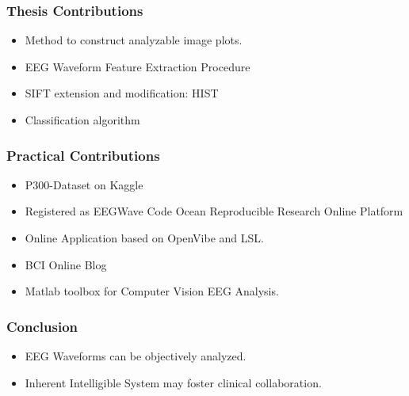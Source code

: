 \documentclass[aspectratio=169]{beamer}
\newcommand\Fontre{\fontsize{16}{16.2}\selectfont}
\begin{document}
\begin{frame}
\frametitle{Thesis Contributions}
\begin{center}
\begin{itemize}
\item \Fontre Method to construct analyzable image plots.
\item \Fontre EEG Waveform Feature Extraction Procedure
\item \Fontre SIFT extension and modification: HIST
\item \Fontre Classification algorithm
\end{itemize}
\end{center}
\end{frame}        

\begin{frame}
\frametitle{Practical Contributions}
\begin{center}
\begin{itemize}
\item \Fontre P300-Dataset on Kaggle
\item \Fontre Registered as EEGWave Code Ocean Reproducible Research Online Platform
\item \Fontre Online Application based on OpenVibe and LSL.
\item \Fontre BCI Online Blog
\item \Fontre Matlab toolbox for Computer Vision EEG Analysis.
\end{itemize}
\end{center}
\end{frame} 
    
\begin{frame}
\frametitle{Conclusion}
\begin{center}
\begin{itemize}
\item \Fontre EEG Waveforms can be objectively analyzed.
\item \Fontre Inherent Intelligible System may foster clinical collaboration.
\end{itemize}
\end{center}
\end{frame}    
    
%
\end{document}
